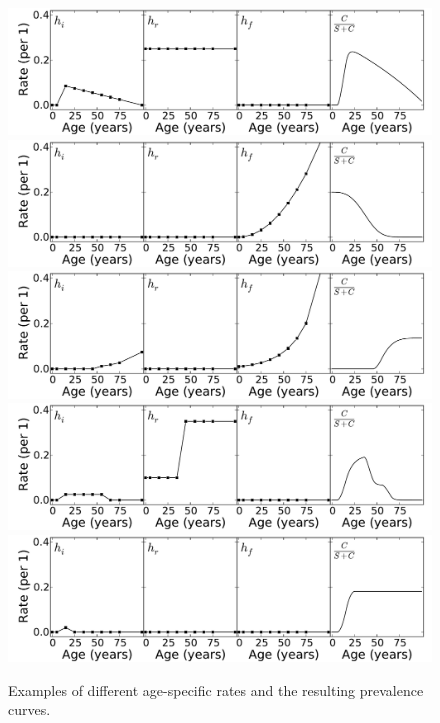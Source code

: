 \begin{figure}
\begin{center}
\includegraphics[width=\textwidth]{forward-sim-mental.pdf}
\includegraphics[width=\textwidth]{forward-sim-congenital.pdf}
\includegraphics[width=\textwidth]{forward-sim-old_age.pdf}
\includegraphics[width=\textwidth]{forward-sim-reproductive.pdf}
\includegraphics[width=\textwidth]{forward-sim-incidence_pulse.pdf}
\caption{Examples of different age-specific rates and the resulting prevalence curves.}
\label{forward-sim-ex3}
\end{center}
\end{figure}

